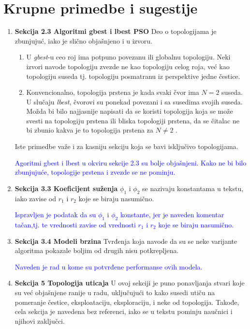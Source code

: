 \documentclass[a4paper]{report}
\newcommand{\odgovor}[1]{\textcolor{blue}{#1}}
\begin{document}
\section{Krupne primedbe i sugestije}
\begin{enumerate}
    \item \textbf{Sekcija 2.3 Algoritmi gbest i lbest PSO} Deo o topologijama je zbunjujuć, iako je slično objašnjeno i u izvoru.
    \begin{enumerate}
        \item U \textit{gbest}-u ceo roj ima potpuno povezanu ili globalnu topologiju. Neki izvori navode topologiju zvezde ne kao topologiju celog roja, već kao topologiju suseda tj. topologiju posmatranu iz perspektive jedne čestice.
        \item Konvencionalno, topologija prstena je kada svaki čvor ima $N=2$ suseda. U slučaju \textit{lbest}, čvorovi su ponekad povezani i sa susedima svojih suseda. Možda bi bilo najjasnije napisati da se koristi topologija koja se može svesti na topologiju prstena ili bliska topologiji prstena, da se čitalac ne bi zbunio kakva je to topologija prstena za $N\neq 2$ .
    \end{enumerate}
    Iste primedbe važe i za kasniju sekciju koja se bavi isključivo topologijama.
    
    
    \odgovor{Agoritmi gbest i lbest u okviru sekcije 2.3 su bolje objašnjeni. Kako ne bi bilo zbunjujuće, topologije prstena i zvezde se ne pominju. } 
    
    
    
    \item \textbf{Sekcija 3.3 Koeficijent suženja} $\phi_1$ i $\phi_2$ se nazivaju konstantama u tekstu, iako zavise od $r_1$ i $r_2$ koje se biraju nasumično.
    
    \odgovor{Ispravljen je podatak da su  $\phi_1$ i $\phi_2$ konstante, jer je naveden komentar tačan,tj. te vrednosti zavise od vrednosti $r_1$ i $r_2$ koje se biraju nasumično. } 
    
    \item \textbf{Sekcija 3.4 Modeli brzina} Tvrđenja koja navode da su se neke varijante algoritma pokazale boljim od drugih nisu potkrepljena.
    
    \odgovor{Naveden je rad u kome su potvrđene performanse ovih modela.}
    
    \item \textbf{Sekcija 5 Topologija uticaja} U ovoj sekciji je puno ponavljanja stvari koje su već objašnjene ranije u radu, uključujući to kako susedi utiču na pomeranje čestice, eksploataciju, eksploraciju, i neke od topologija. Takođe, cela sekcija je navedena bez referenci, iako se u tekstu pominju naučnici i njihovi zaključci.
    

\end{enumerate}
\end{document}
